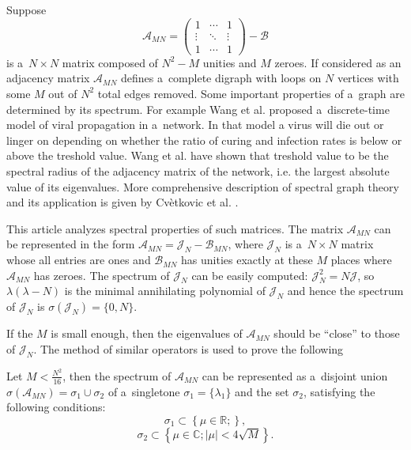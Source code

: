 Suppose
\[
    \mathscr{A}_{MN} =
    \begin{pmatrix}
        1 & \cdots & 1 \\
        \vdots & \ddots & \vdots \\
        1 & \cdots & 1
    \end{pmatrix} - \mathscr{B}
    \]
is a~\( N\times N \) matrix composed of
\( N^2 - M \) unities and \( M \) zeroes.
If considered as an adjacency matrix \( \mathscr{A}_{MN} \)
defines a~complete digraph with loops on \( N \) vertices
with some \( M \) out of \( N^2 \) total edges removed.
Some important properties of a~graph are determined by its spectrum.
For example Wang et al. \cite{epidemic} proposed a~discrete-time model
of viral propagation in a~network.
In that model a virus will die out or linger on
depending on whether the ratio of curing and infection rates
is below or above the treshold value.
Wang et al. have shown that treshold value
to be the spectral radius of the adjacency matrix of the network,
i.e. the largest absolute value of its eigenvalues.
More comprehensive description of spectral graph theory
and its application is given by Cv\`etkovic et al. \cite{cvet}.

This article analyzes spectral properties of such matrices.
The matrix \( \mathscr{A}_{MN} \) can be represented in the form
\( \mathscr{A}_{MN} = \mathcal{J}_N - \mathscr{B}_{MN} \),
where \( \mathcal{J}_N \) is a~\( N\times N \) matrix
whose all entries are ones
and \( \mathcal{B}_{MN} \) has unities exactly at these \( M \)
places where \( \mathscr{A}_{MN} \) has zeroes.
The spectrum of \( \mathcal{J}_N \) can be easily computed:
\( \mathcal{J}_N^2 = N \mathcal{J} \),
so \( \lambda(\lambda - N) \) is the minimal
annihilating polynomial of \( \mathcal{J}_N \)
and hence the spectrum of \( \mathcal{J}_{N} \) is
\( \sigma(\mathcal{J}_N) = \{ 0,N \} \).

If the \( M \) is small enough, then the eigenvalues of \( \mathscr{A}_{MN} \)
should be ``close'' to those of \( \mathcal{J}_N \).
The method of similar operators \cite{baskakov-harmonic,baskakov-split} is used
to prove the following
\begin{thm}\label{kozlukovsv:thm:almost-all-ones}
    Let \( M < \frac{N^2}{16} \),
    then the spectrum of \( \mathscr{A}_{MN} \) can be represented as a~disjoint union
    \( \sigma\left(\mathscr{A}_{MN}\right) = \sigma_1 \cup \sigma_2 \)
    of a~singletone \( \sigma_1=\{\lambda_1\} \)
    and the set \( \sigma_2 \), satisfying the following conditions:
    \[
        \sigma_1 \subset \left\{
            \mu\in\mathbb{R}; %
            \right\},
        \]
    \[ \sigma_2 \subset \left\{ \mu\in\mathbb{C}; \lvert \mu \rvert < 4\sqrt{M} \right\}. \]
\end{thm}

